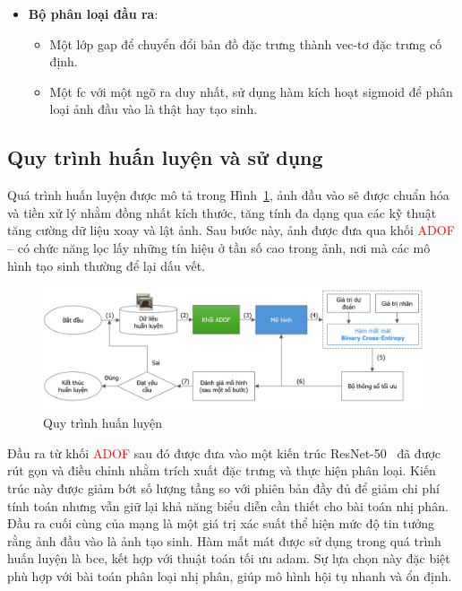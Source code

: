 \begin{itemize}
	\item \textbf{Bộ phân loại đầu ra}:
	\begin{itemize}
		\item Một lớp \gls{gap} để chuyển đổi bản đồ đặc trưng thành vec-tơ đặc trưng cố định.
		\item Một \gls{fc} với một ngõ ra duy nhất, sử dụng hàm kích hoạt \gls{sigmoid} để phân loại ảnh đầu vào là thật hay tạo sinh.
	\end{itemize}
\end{itemize}

\subsection{Quy trình huấn luyện và sử dụng}
%
\label{ssec:quy_trinh_huan_luyen}
%
Quá trình huấn luyện được mô tả trong Hình~\ref{fig:offline-training-process}, ảnh đầu vào sẽ được chuẩn hóa và tiền xử lý nhằm đồng nhất kích thước, tăng tính đa dạng qua các kỹ thuật tăng cường dữ liệu xoay và lật ảnh. Sau bước này, ảnh được đưa qua khối \textcolor{red}{ADOF} – có chức năng lọc lấy những tín hiệu ở tần số cao trong ảnh, nơi mà các mô hình tạo sinh thường để lại dấu vết.
%
\begin{figure}[h!]
	\centering
	\includegraphics[width=1.0\linewidth]{Images/offline-training-process.png}
	\begin{minipage}{1.0\linewidth}
		\vspace{3mm}
		\caption{Quy trình huấn luyện}
		\label{fig:offline-training-process}
	\end{minipage}
\end{figure}
%
Đầu ra từ khối \textcolor{red}{ADOF} sau đó được đưa vào một kiến trúc ResNet-50~\cite{He2015DeepRL} đã được rút gọn và điều chỉnh nhằm trích xuất đặc trưng và thực hiện phân loại. Kiến trúc này được giảm bớt số lượng tầng so với phiên bản đầy đủ để giảm chi phí tính toán nhưng vẫn giữ lại khả năng biểu diễn cần thiết cho bài toán nhị phân. Đầu ra cuối cùng của mạng là một giá trị xác suất thể hiện mức độ tin tưởng rằng ảnh đầu vào là ảnh tạo sinh. Hàm mất mát được sử dụng trong quá trình huấn luyện là \gls{bce}, kết hợp với thuật toán tối ưu \gls{adam}. Sự lựa chọn này đặc biệt phù hợp với bài toán phân loại nhị phân, giúp mô hình hội tụ nhanh và ổn định. 

